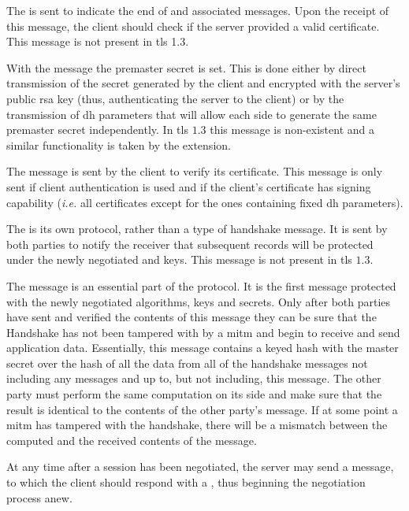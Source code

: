 \documentclass{llncs}
\begin{document}
The  is sent to indicate the end of 
and associated messages. Upon the receipt of this message, the client should check
if the server provided a valid certificate. This message is not present in \gls{tls} 1.3.

With the  message the premaster secret is
set. This is done either by direct transmission of the secret generated by the client
and encrypted with the server's public \gls{rsa} key (thus, authenticating the server to the client)
or by the transmission of \gls{dh} parameters that will allow each side to generate
the same premaster secret independently. In \gls{tls} $1.3$ this message is
non-existent and a similar functionality is taken by the
 extension.

The  message is sent by the client to verify its
certificate. This message is only sent if client authentication is used and
if the client's certificate has signing capability (\textit{i.e.} all certificates except for the ones
containing fixed \gls{dh} parameters).

The  is its own protocol, rather than a type of handshake
message. It is sent by both parties to notify the receiver that subsequent records
will be protected under the newly negotiated  and keys.
This message is not present in \gls{tls} $1.3$.

The  message is an essential part of the protocol. It is the first
message protected with the newly negotiated algorithms, keys and secrets. Only after
both parties have sent and verified the contents of this message they can
be sure that the Handshake has not been tampered with by a \gls{mitm} and begin to
receive and send application data. Essentially, this message contains a keyed hash
with the master secret over the hash of all the data from all of the
handshake messages not including any  messages and up to, but
not including, this message. The other party must perform the same computation on its
side and make sure that the result is identical to the contents of the other party's
 message. If at some point a \gls{mitm} has tampered with the
handshake, there will be a mismatch between the computed and the received contents of the
 message.

At any time after a session has been negotiated, the server may send a 
message, to which the client should respond with a , thus
beginning the negotiation process anew.
\end{document}
